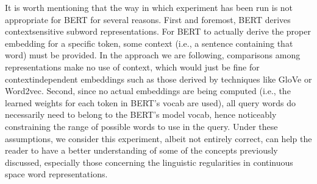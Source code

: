 \documentclass[letterpaper,10pt,english]{sphinxmanual}
\begin{document}
{
\begin{sphinxVerbatim}[commandchars=\\\{\}]
\llap{\color{nbsphinxin}[2]:\,\hspace{\fboxrule}\hspace{\fboxsep}}  

  

  

  

  
\end{sphinxVerbatim}
}

It is worth mentioning that the way in which experiment has been run is not appropriate for BERT for several reasons. First and foremost, BERT derives context\sphinxhyphen{}sensitive subword representations. For BERT to actually derive the proper embedding for a specific token, some context (i.e., a sentence containing that word) must be provided. In the approach we are following, comparisons among representations make no use of context, which would just be fine for context\sphinxhyphen{}independent embeddings such as
those derived by techniques like GloVe or Word2vec. Second, since no actual embeddings are being computed (i.e., the learned weights for each token in BERT’s vocab are used), all query words do necessarily need to belong to the BERT’s model vocab, hence noticeably constraining the range of possible words to use in the query. Under these assumptions, we consider this experiment, albeit not entirely correct, can help the reader to have a better understanding of some of the concepts previously
discussed, especially those concerning the linguistic regularities in continuous space word representations.
\end{document}
